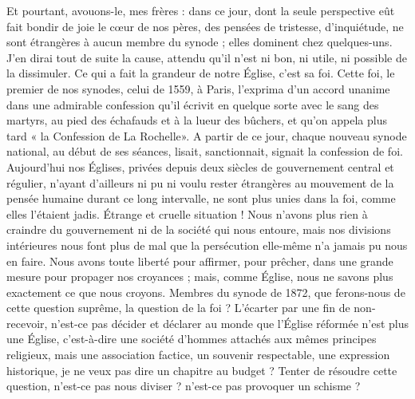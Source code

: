 Et pourtant, avouons-le, mes frères : dans ce jour, dont la seule perspective eût fait bondir de joie le cœur de nos pères, des pensées de tristesse, d’inquiétude, ne sont étrangères à aucun membre du synode ; elles dominent chez quelques-uns. J’en dirai tout de suite la cause, attendu qu’il n’est ni bon, ni utile, ni possible de la dissimuler. Ce qui a fait la grandeur de notre Église, c’est sa foi. Cette foi, le premier de nos synodes, celui de 1559, à Paris, l’exprima d’un accord unanime dans une admirable confession qu’il écrivit en quelque sorte avec le sang des martyrs, au pied des échafauds et à la lueur des bûchers, et qu’on appela plus tard « la Confession de La Rochelle». A partir de ce jour, chaque nouveau synode national, au début de ses séances, lisait, sanctionnait, signait la confession de foi. Aujourd’hui nos Églises, privées depuis deux siècles de gouvernement central et régulier, n’ayant d’ailleurs ni pu ni voulu rester étrangères au mouvement de la pensée humaine durant ce long intervalle, ne sont plus unies dans la foi, comme elles l’étaient jadis. Étrange et cruelle situation ! Nous n’avons plus rien à craindre du gouvernement ni de la société qui nous entoure, mais nos divisions intérieures nous font plus de mal que la persécution elle-même n’a jamais pu nous en faire. Nous avons toute liberté pour affirmer, pour prêcher, dans une grande mesure pour propager nos croyances ; mais, comme Église, nous ne savons plus exactement ce que nous croyons. Membres du synode de 1872, que ferons-nous de cette question suprême, la question de la foi ? L’écarter par une fin de non-recevoir, n’est-ce pas décider et déclarer au monde que l’Église réformée n’est plus une Église, c’est-à-dire une société d’hommes attachés aux mêmes principes religieux, mais une association factice, un souvenir respectable, une expression historique, je ne veux pas dire un chapitre au budget ? Tenter de résoudre cette question, n’est-ce pas nous diviser ? n’est-ce pas provoquer un schisme ?

